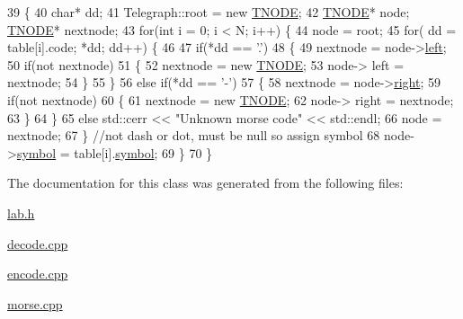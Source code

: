 \begin{DoxyCode}
39 \{
40     \textcolor{keywordtype}{char}* dd;
41     Telegraph::root = \textcolor{keyword}{new} \hyperlink{structTNODE}{TNODE};
42     \hyperlink{structTNODE}{TNODE}* node; \hyperlink{structTNODE}{TNODE}* nextnode;
43     \textcolor{keywordflow}{for}(\textcolor{keywordtype}{int} i = 0; i < N; i++) \{
44         node = root;
45         \textcolor{keywordflow}{for}( dd = table[i].code; *dd; dd++) \{
46                 
47             \textcolor{keywordflow}{if}(*dd == \textcolor{charliteral}{'.'}) 
48             \{
49                 nextnode = node->\hyperlink{structTNODE_ac8548d0ee2d54b914e0e07ab35375dba}{left};
50                 \textcolor{keywordflow}{if}(not nextnode) 
51                 \{
52                 nextnode = \textcolor{keyword}{new} \hyperlink{structTNODE}{TNODE};
53                 node-> left = nextnode;
54                 \}
55             \}
56             \textcolor{keywordflow}{else} \textcolor{keywordflow}{if}(*dd == \textcolor{charliteral}{'-'})
57              \{
58                 nextnode = node->\hyperlink{structTNODE_a4e135d9137519b2a4b89dbccb55ae967}{right};
59                 \textcolor{keywordflow}{if}(not nextnode) 
60                 \{
61                 nextnode = \textcolor{keyword}{new} \hyperlink{structTNODE}{TNODE};
62                 node-> right = nextnode;
63                 \}
64             \}
65             \textcolor{keywordflow}{else} std::cerr << \textcolor{stringliteral}{"Unknown morse code"} << std::endl;
66             node = nextnode;
67          \} \textcolor{comment}{//not dash or dot, must be null so assign symbol}
68          node->\hyperlink{structTNODE_a436db20d992c4227b8482603b4f76712}{symbol} = table[i].\hyperlink{structMorseCode_a15f3e521a3db80ec2f44a9c42b5cb949}{symbol};
69     \}
70 \}
\end{DoxyCode}


The documentation for this class was generated from the following files\+:\begin{DoxyCompactItemize}
\item 
\hyperlink{lab_8h}{lab.\+h}\item 
\hyperlink{decode_8cpp}{decode.\+cpp}\item 
\hyperlink{encode_8cpp}{encode.\+cpp}\item 
\hyperlink{morse_8cpp}{morse.\+cpp}\end{DoxyCompactItemize}
